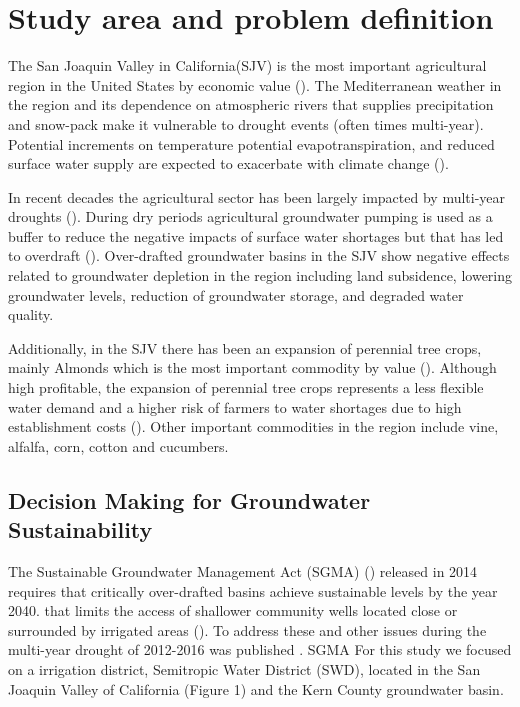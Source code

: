 \documentclass[11pt,a4paper]{article}
\begin{document}
\section{Study area and problem definition}

The San Joaquin Valley in California(SJV) is the most important agricultural region in the United States by economic value (\cite{usda_national_2020}). The Mediterranean weather in the region and its dependence on atmospheric rivers that supplies precipitation and snow-pack make it vulnerable to drought events (often times multi-year). Potential increments on temperature potential evapotranspiration, and reduced surface water supply are expected to exacerbate with climate change (\cite{fernandez-bou_regional_2021}).

 In recent decades the agricultural sector has been largely impacted by multi-year droughts (\cite{lund_lessons_2018,medellin-azuara_economic_2022}).  During dry periods agricultural groundwater pumping is used as a buffer to reduce the negative impacts of surface water shortages but that has led to overdraft (\cite{liu_groundwater_2022}). Over-drafted groundwater basins in the SJV show negative effects related to groundwater depletion in the region including land subsidence, lowering groundwater levels, reduction of groundwater storage, and degraded water quality.  
 
 Additionally, in the SJV there has been an expansion of perennial tree crops, mainly Almonds which is the most important commodity by value (\cite{usda_national_2020}). Although high profitable, the expansion of perennial tree crops represents a less flexible water demand and a higher risk of farmers to water shortages due to high establishment costs (\cite{qin_flexibility_2019,mall_water_2019}). Other important commodities in the region include vine, alfalfa, corn, cotton and cucumbers. 

\subsection{Decision Making for Groundwater Sustainability}

 The Sustainable Groundwater Management Act (SGMA) (\cite{dwr_sustainable_2021}) released in 2014 requires that critically over-drafted basins achieve sustainable levels by the year 2040. that limits the access of shallower community wells located close or surrounded by irrigated areas (\cite{pauloo_domestic_2020}). To address these and other issues during the multi-year drought of 2012-2016  was published . SGMA  For this study we focused on a irrigation district, Semitropic Water District (SWD), located in the San Joaquin Valley of California (Figure 1) and the Kern County groundwater basin.
\end{document}
